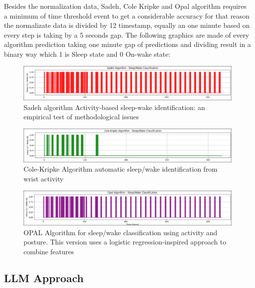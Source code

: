 \documentclass[conference]{IEEEtran}
\begin{document}
Besides the normalization data, Sadeh, Cole Kripke and Opal algorithm requires a minimum of time threshold event
to get a considerable accuracy for that reason the normalizate data is divided by 12 timestamp, equally an
one minute based on every step is taking by a 5 seconds gap. The following graphics are made of every
algorithm prediction taking one minute gap of predictions and dividing result in a binary way which 1 is Sleep state
and 0 On-wake state:

\begin{figure}[htbp]
	\centering
	\includegraphics[width=0.85\columnwidth]{sadeh_result.png}
	\caption{Sadeh algorithm Activity-based sleep-wake identification: an empirical test of methodological issues}
	\label{fig:Sadeh algorithm prediction sleep state}
\end{figure}

\begin{figure}[htbp]
	\centering
	\includegraphics[width=0.85\columnwidth]{Cole_result.png}
	\caption{Cole-Kripke Algorithm automatic sleep/wake identification from wrist activity}
	\label{fig:Cole-Kripke algorithm prediction sleep state}
\end{figure}

\begin{figure}[H]
	\centering
	\includegraphics[width=0.85\columnwidth]{Opal_result.png}
	\caption{OPAL Algorithm for sleep/wake classification using activity and posture.
	This version uses a logistic regression-inspired approach to combine features}
	\label{fig:OPAL algorithm prediction sleep state}
\end{figure}

\subsection{LLM Approach}
\end{document}
